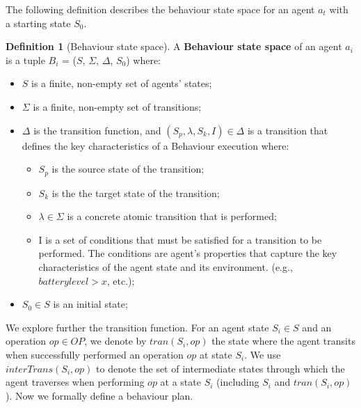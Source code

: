 \documentclass[journal]{IEEEtran}
\theoremstyle{definition}
\newtheorem{definition}{Definition}
\begin{document}

The following definition describes the behaviour state space for an agent $a_t$ with a starting state $S_{0}$.

\begin{definition}[Behaviour state space]
A \textbf{Behaviour state space} of an agent $a_i$ is a tuple $B_i$ = ($S$, $\Sigma$, $\Delta $, $S_{0}$)  where: 
\begin{itemize}
\item $S$ is a finite, non-empty set of agents' states;
\item $\Sigma$ is a finite, non-empty set of transitions;
\item $ \Delta $ is the transition function,
and $(S_p,\lambda,S_k,I) \in \Delta $ is a transition
that defines the key characteristics of a Behaviour execution
where:
\begin{itemize}
\item  $S_p$ is the source state of the transition;
\item  $S_k$ is the the target state of the transition;
\item  $\lambda \in \Sigma$ is a concrete atomic transition that is performed;
\item I is a set of conditions that must be satisfied for a transition to be performed. The conditions are agent's properties that capture the key characteristics of the agent state and its environment.
(e.g., $battery level > x$, etc.);
\end{itemize}
\item $S_{0} \in S$ is an initial state;
\end{itemize}
\end{definition}


We explore further the transition function. 
For an agent state $S_i \in S$ and an operation $ op \in  OP$, we denote by $tran(S_i,op )$ the state where the agent transits when successfully performed an operation $ op $ at state $S_i$. We use $ interTrans(S_i,op) $ to denote the set of intermediate states through which the agent traverses when performing $ op $ at a state $S_i$ (including $S_i$ and $tran(S_i,op)$). 
Now we formally define a behaviour plan.
\end{document}
